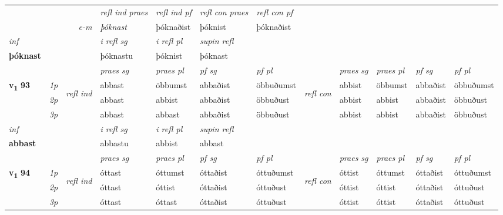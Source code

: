 \begin{longtable}[l]{X>{\footnotesize\itshape}llXXXXlXXXX}
 & && \textit{refl ind praes} & \textit{refl ind pf} & \textit{refl con praes} & \textit{refl con pf} \\*
\multicolumn{3}{r}{\textit{e-m}}& þóknast & þóknaðist & þóknist & þóknaðist \\*

\cmidrule{4-7}
   {\textit{inf}} & &   & \textit{i refl sg} & \textit{i refl pl}   & \textit{supin refl}  \\*
  {\textbf{þóknast}} & &   & þóknastu & þóknist   & þóknast  \\*

\midrule

 & &   & \textit{praes sg}  & \textit{praes pl}    & \textit{ pf sg} & \textit{pf pl} & & \textit{praes sg}  & \textit{praes pl}    & \textit{pf sg} & \textit{pf pl }  \\ \cmidrule{4-7} \cmidrule{9-12}
 \multirow{2}{*}{{{\textbf{v{\textsubscript{1}}} \Large{\textbf{93}}}}}  & 1p & \multirow{3}{*}{\begin{turn}{90}\textit{refl ind}\end{turn}}  & abbast & öbbumst & abbaðist & öbbuðumst & \multirow{3}{*}{\begin{turn}{90}\textit{refl con}\end{turn}}  &abbist & öbbumst & abbaðist & öbbuðumst \\*
 & 2p &  & abbast & abbist & abbaðist & öbbuðust & &abbist & abbist & abbaðist & öbbuðust \\*
 & 3p  & & abbast & abbast & abbaðist & öbbuðust & & abbist & abbist& abbaðist & öbbuðust \\*
\cmidrule{4-7} \cmidrule{9-12}

   {\textit{inf}} & &   & \textit{i refl sg} & \textit{i refl pl}   & \textit{supin refl}  \\*
  {\textbf{abbast}} & &   & abbastu & abbist   & abbast  \\*

\midrule

 & &   & \textit{praes sg}  & \textit{praes pl}    & \textit{ pf sg} & \textit{pf pl} & & \textit{praes sg}  & \textit{praes pl}    & \textit{pf sg} & \textit{pf pl }  \\ \cmidrule{4-7} \cmidrule{9-12}
 \multirow{2}{*}{{{\textbf{v{\textsubscript{1}}} \Large{\textbf{94}}}}}  & 1p & \multirow{3}{*}{\begin{turn}{90}\textit{refl ind}\end{turn}}  & óttast & óttumst & óttaðist & óttuðumst & \multirow{3}{*}{\begin{turn}{90}\textit{refl con}\end{turn}}  &óttist & óttumst & óttaðist & óttuðumst \\*
 & 2p &  & óttast & óttist & óttaðist & óttuðust & &óttist & óttist & óttaðist & óttuðust \\*
 & 3p  & & óttast & óttast & óttaðist & óttuðust & & óttist & óttist& óttaðist & óttuðust \\*
\cmidrule{4-7} \cmidrule{9-12}


\end{longtable}
